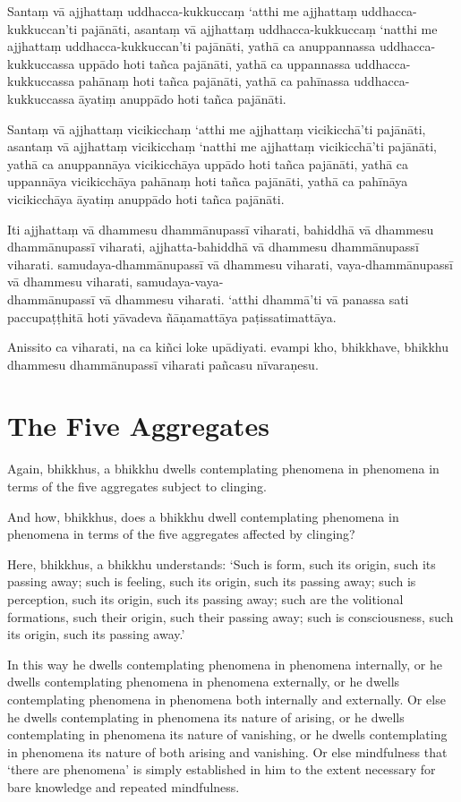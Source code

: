 Santaṃ vā ajjhattaṃ uddhacca-kukkuccaṃ ‘atthi me ajjhattaṃ uddhacca-kukkuccan’ti pajānāti,
asantaṃ vā ajjhattaṃ uddhacca-kukkuccaṃ ‘natthi me ajjhattaṃ uddhacca-kukkuccan’ti pajānāti,
yathā ca anuppannassa uddhacca-kukkuccassa uppādo hoti tañca pajānāti,
yathā ca uppannassa uddhacca-kukkuccassa pahānaṃ hoti tañca pajānāti,
yathā ca pahīnassa uddhacca-kukkuccassa āyatiṃ anuppādo hoti tañca pajānāti.

Santaṃ vā ajjhattaṃ vicikicchaṃ ‘atthi me ajjhattaṃ vicikicchā’ti pajānāti,
asantaṃ vā ajjhattaṃ vicikicchaṃ ‘natthi me ajjhattaṃ vicikicchā’ti pajānāti,
yathā ca anuppannāya vicikicchāya uppādo hoti tañca pajānāti,
yathā ca uppannāya vicikicchāya pahānaṃ hoti tañca pajānāti,
yathā ca pahīnāya vicikicchāya āyatiṃ anuppādo hoti tañca pajānāti.

Iti ajjhattaṃ vā dhammesu dhammānupassī viharati,
bahiddhā vā dhammesu dhammānupassī viharati,
ajjhatta-bahiddhā vā dhammesu dhammānupassī viharati.
samudaya-dhammānupassī vā dhammesu viharati,
vaya-dhammānupassī vā dhammesu viharati,
samudaya-vaya-\\ dhammānupassī vā dhammesu viharati.
‘atthi dhammā’ti vā panassa sati paccupaṭṭhitā hoti
yāvadeva ñāṇamattāya paṭissatimattāya.

Anissito ca viharati, na ca kiñci loke upādiyati. evampi kho, bhikkhave, bhikkhu
dhammesu dhammānupassī viharati pañcasu nīvaraṇesu.


\englishPage
\section{The Five Aggregates}

Again, bhikkhus, a bhikkhu dwells contemplating phenomena in phenomena in terms
of the five aggregates subject to clinging.

And how, bhikkhus, does a bhikkhu dwell contemplating phenomena in phenomena in
terms of the five aggregates affected by clinging?

Here, bhikkhus, a bhikkhu understands:
`Such is form, such its origin, such its passing away;
such is feeling, such its origin, such its passing away;
such is perception, such its origin, such its passing away;
such are the volitional formations, such their origin, such their passing away;
such is consciousness, such its origin, such its passing away.'

In this way he dwells contemplating phenomena in phenomena internally, or he
dwells contemplating phenomena in phenomena externally, or he dwells
contemplating phenomena in phenomena both internally and externally. Or else he
dwells contemplating in phenomena its nature of arising, or he dwells
contemplating in phenomena its nature of vanishing, or he dwells contemplating
in phenomena its nature of both arising and vanishing. Or else mindfulness that
‘there are phenomena’ is simply established in him to the extent necessary for
bare knowledge and repeated mindfulness.

